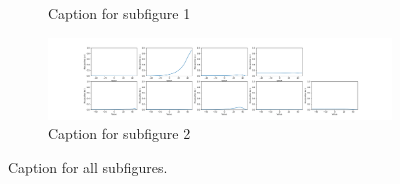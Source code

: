 \begin{figure}[htb!]
\begin{subfigure}[b]{\textwidth}
            \caption{Caption for subfigure 1}
            \label{fig:Shade-misclass0}
        \end{subfigure}
        \begin{subfigure}[b]{ \textwidth}
            \centering
            \includegraphics[width=\textwidth]{chapters/results/CNN/Shade/acc5.png}
            \caption{Caption for subfigure 2}
            \label{fig:Shade-misclass1}
        \end{subfigure}
        \caption{Caption for all subfigures.}
        \label{fig:Shade-misclassifications}
    \end{figure}
    

